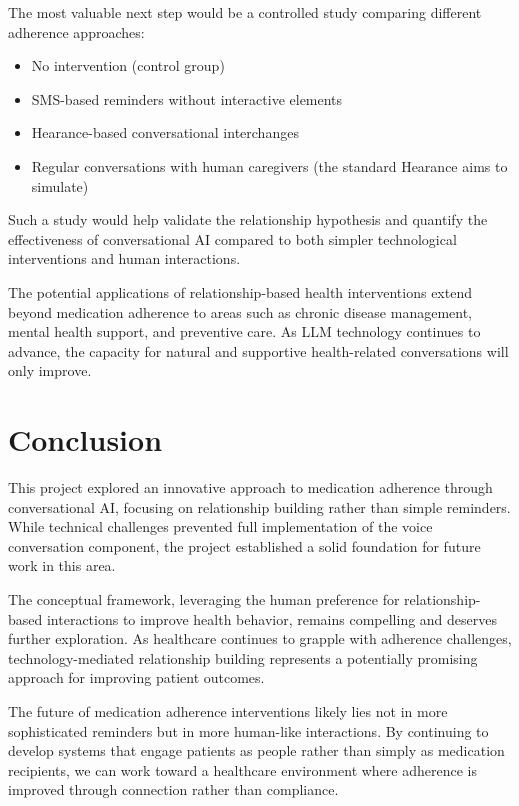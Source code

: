 \documentclass[sigconf]{acmart}
\begin{document}
The most valuable next step would be a controlled study comparing different adherence approaches:

\begin{itemize}
\item No intervention (control group)
\item SMS-based reminders without interactive elements
\item Hearance-based conversational interchanges
\item Regular conversations with human caregivers (the standard Hearance aims to simulate)
\end{itemize}

Such a study would help validate the relationship hypothesis and quantify the effectiveness of conversational AI compared to both simpler technological interventions and human interactions.

The potential applications of relationship-based health interventions extend beyond medication adherence to areas such as chronic disease management, mental health support, and preventive care. As LLM technology continues to advance, the capacity for natural and supportive health-related conversations will only improve.

\section{Conclusion}
This project explored an innovative approach to medication adherence through conversational AI, focusing on relationship building rather than simple reminders. While technical challenges prevented full implementation of the voice conversation component, the project established a solid foundation for future work in this area.

The conceptual framework, leveraging the human preference for relationship-based interactions to improve health behavior, remains compelling and deserves further exploration. As healthcare continues to grapple with adherence challenges, technology-mediated relationship building represents a potentially promising approach for improving patient outcomes.

The future of medication adherence interventions likely lies not in more sophisticated reminders but in more human-like interactions. By continuing to develop systems that engage patients as people rather than simply as medication recipients, we can work toward a healthcare environment where adherence is improved through connection rather than compliance.



\end{document}
